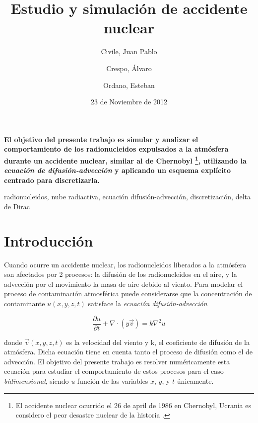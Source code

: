 \documentclass[twocolumn,a4paper,10pt]{article}
\title{Estudio y simulaci\'on de accidente nuclear}
\date{23 de Noviembre de 2012}
\author{Civile, Juan Pablo \and Crespo, Álvaro \and Ordano, Esteban }
\begin{document}
\pagestyle{fancy}
\maketitle
\thispagestyle{fancy}

\begin{customabstract}
\textbf{
El objetivo del presente trabajo es simular y analizar el comportamiento de los radionucleidos expulsados a la atm\'osfera durante un accidente nuclear, similar al 
de Chernobyl \footnote{El accidente nuclear ocurrido el 26 de april de 1986 en Chernobyl, Ucrania es considero el peor desastre nuclear de la historia \cite{Chernobyl}.}, 
utilizando la \textit{ecuaci\'on de difusi\'on-advecci\'on} y aplicando un esquema expl\'icito centrado para discretizarla.
}
\end{customabstract}

\begin{keywords}
radionucleidos, nube radiactiva,  ecuaci\'on difusi\'on-advecci\'on, discretizaci\'on, delta de Dirac
\end{keywords}

\section{Introducci\'on}

Cuando ocurre un accidente nuclear, los radionucleidos liberados a la atm\'osfera son afectados por 2 procesos: la difusi\'on de los radionucleidos en el aire, y
la advecci\'on por el movimiento la masa de aire debido al viento. Para modelar el proceso de contaminaci\'on atmosf\'erica puede considerarse que la concentraci\'on de
contaminante $u(x,y,z,t)$ satisface la \textit{ecuaci\'on difusi\'on-advecci\'on} \cite{Guia2-MNA} \cite{Convection-diffussion equation}

\begin{equation}
\label{ec:difusion-adveccion}
    \frac{\partial u}{\partial t} + \nabla \cdot (y \vec{v}) = k \nabla^2 u
\end{equation}

donde $\vec{v} (x,y,z,t)$ es la velocidad del viento  y k, el coeficiente de difusi\'on de la atm\'osfera. Dicha ecuaci\'on tiene en cuenta tanto el proceso de 
difusi\'on como el de advecci\'on. El objetivo del presente trabajo es resolver num\'ericamente esta ecuaci\'on para estudiar el comportamiento de estos procesos 
para el caso \textit{bidimensional}, siendo $u$ funci\'on de las variables $x$, $y$, y $t$ \'unicamente.
\end{document}
